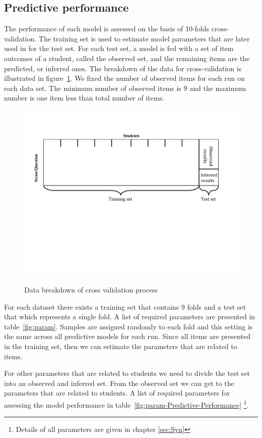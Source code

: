 \subsection{Predictive performance}

The performance of each model is assessed on the basis of 10-folds cross-validation.  The training set is used to estimate model parameters that are later used in for the test set. For each test set, a model is fed with a set of item outcomes of a student, called the observed set, and the remaining items are the predicted, or inferred ones. The breakdown of the data for cross-validation is illustrated in figure~\ref{figMethod}. We fixed the number of observed items for each run on each data set. The minimum number of observed items is 9 and the maximum number is one item less than total number of items. 

\begin{figure}[h]
\centering
{\includegraphics[trim=1cm 9cm 2.4cm 2.4cm,clip=true,width=.7\textwidth]{Images/Methodology.pdf}}
\caption{Data breakdown of cross validation process}
\label{figMethod}
\end{figure}

For each dataset there exists a training set that contains 9 folds and a test set that which represents a single fold. A list of required parameters are presented in table~\ref{fig:param}. Samples are assigned randomly to each fold and this setting is the same across all predictive models for each run. Since all items are presented in the training set, then we can estimate the parameters that are related to items. 



For other parameters that are related to students we need to divide the test set into an observed and inferred set. From the observed set we can get to the parameters that are related to students. A list of required parameters for assessing the model performance in table~\ref{fig:param-Predictive-Performance} \footnote{Details of all parameters are given in chapter \ref{sec:Syn}}.

